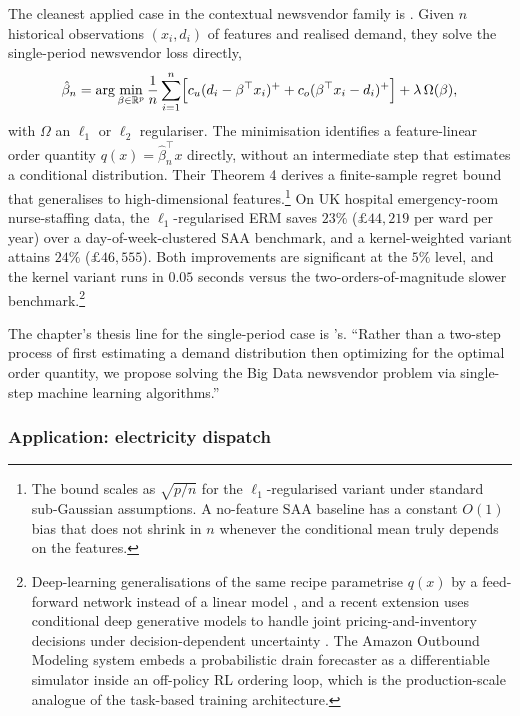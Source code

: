 The cleanest applied case in the contextual newsvendor family is
\citet{BanRudin2019}. Given $n$ historical observations $(x_i, d_i)$ of
features and realised demand, they solve the single-period newsvendor
loss directly,
\begin{equation}
\hat\beta_n = \arg\min_{\beta \in \mathbb R^p}\frac{1}{n} \sum_{i=1}^n
\Bigl[ c_u (d_i - \beta^\top x_i)^+ + c_o (\beta^\top x_i - d_i)^+ \Bigr]
+ \lambda\, \Omega(\beta),
\label{eq:banrudin_erm}
\end{equation}
with $\Omega$ an $\ell_1$ or $\ell_2$ regulariser. The minimisation
identifies a feature-linear order quantity $q(x) = \hat\beta_n^\top x$
directly, without an intermediate step that estimates a conditional
distribution. Their Theorem 4 derives a finite-sample regret bound that
generalises \citet{Levi2007} to high-dimensional features.\footnote{The bound
scales as $\sqrt{p/n}$ for the $\ell_1$-regularised variant under standard
sub-Gaussian assumptions. A no-feature SAA baseline has a constant $O(1)$
bias that does not shrink in $n$ whenever the conditional mean truly
depends on the features.} On UK hospital emergency-room nurse-staffing
data, the $\ell_1$-regularised ERM saves $23\%$ ($\pounds 44{,}219$ per
ward per year) over a day-of-week-clustered SAA benchmark, and a
kernel-weighted variant attains $24\%$ ($\pounds 46{,}555$). Both
improvements are significant at the $5\%$ level, and the kernel variant
runs in $0.05$ seconds versus the two-orders-of-magnitude slower
benchmark.\footnote{Deep-learning generalisations of the same recipe
parametrise $q(x)$ by a feed-forward network instead of a linear model
\citep{Oroojlooyjadid2020}, and a recent extension uses conditional deep
generative models to handle joint pricing-and-inventory decisions under
decision-dependent uncertainty \citep{HanZhengMisra2024}. The Amazon
Outbound Modeling system \citep{Amazon2025} embeds a probabilistic drain
forecaster as a differentiable simulator inside an off-policy RL ordering
loop, which is the production-scale analogue of the
\citet{DontiAmosKolter2017} task-based training architecture.}

The chapter's thesis line for the single-period case is
\citet{BanRudin2019}'s. ``Rather than a two-step process of first
estimating a demand distribution then optimizing for the optimal order
quantity, we propose solving the Big Data newsvendor problem via
single-step machine learning algorithms.''

\subsubsection{Application: electricity dispatch}
\label{sec:app_electricity}

